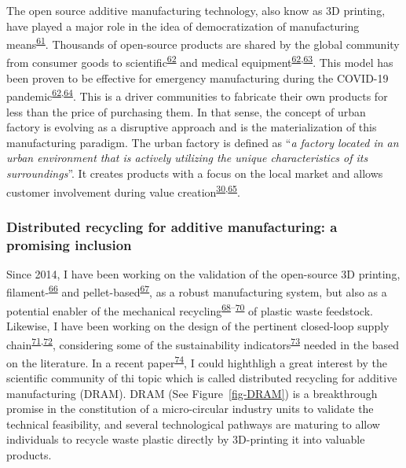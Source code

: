 \documentclass[
  11pt,
  a4paperpaper,
  onecolumn]{article}
\begin{document}
The open source additive manufacturing technology, also know as 3D
printing, have played a major role in the idea of democratization of
manufacturing
means\textsuperscript{\protect\hyperlink{ref-Beltagui2020}{61}}.
Thousands of open-source products are shared by the global community
from consumer goods to
scientific\textsuperscript{\protect\hyperlink{ref-Pearce2020a}{62}} and
medical
equipment\textsuperscript{\protect\hyperlink{ref-Pearce2020a}{62},\protect\hyperlink{ref-He2014}{63}}.
This model has been proven to be effective for emergency manufacturing
during the COVID-19
pandemic\textsuperscript{\protect\hyperlink{ref-Pearce2020a}{62},\protect\hyperlink{ref-tan2021}{64}}.
This is a driver communities to fabricate their own products for less
than the price of purchasing them. In that sense, the concept of urban
factory is evolving as a disruptive approach and is the materialization
of this manufacturing paradigm. The urban factory is defined as
``\emph{a factory located in an urban environment that is actively
utilizing the unique characteristics of its surroundings}''. It creates
products with a focus on the local market and allows customer
involvement during value
creation\textsuperscript{\protect\hyperlink{ref-Herrmann2020}{30},\protect\hyperlink{ref-Ijassi2022}{65}}.

\hypertarget{distributed-recycling-for-additive-manufacturing-a-promising-inclusion}{%
\subsubsection{Distributed recycling for additive manufacturing: a
promising
inclusion}\label{distributed-recycling-for-additive-manufacturing-a-promising-inclusion}}

Since 2014, I have been working on the validation of the open-source 3D
printing,
filament-\textsuperscript{\protect\hyperlink{ref-CruzSanchez2014}{66}}
and
pellet-based\textsuperscript{\protect\hyperlink{ref-Arthur2020}{67}}, as
a robust manufacturing system, but also as a potential enabler of the
mechanical
recycling\textsuperscript{\protect\hyperlink{ref-Cruz2015}{68}--\protect\hyperlink{ref-lopez2022}{70}}
of plastic waste feedstock. Likewise, I have been working on the design
of the pertinent closed-loop supply
chain\textsuperscript{\protect\hyperlink{ref-Pavlo2018}{71},\protect\hyperlink{ref-Santander2020}{72}},
considering some of the sustainability
indicators\textsuperscript{\protect\hyperlink{ref-Santander2022}{73}}
needed in the based on the literature. In a recent
paper\textsuperscript{\protect\hyperlink{ref-CruzSanchez2020}{74}}, I
could highthligh a great interest by the scientific community of thi
topic which is called distributed recycling for additive manufacturing
(DRAM). DRAM (See Figure~\ref{fig-DRAM}) is a breakthrough promise in
the constitution of a micro-circular industry units to validate the
technical feasibility, and several technological pathways are maturing
to allow individuals to recycle waste plastic directly by 3D-printing it
into valuable products.
\end{document}
